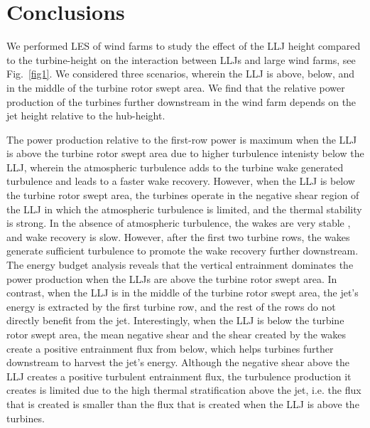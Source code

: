 \documentclass[%
 aip,
 amsmath,amssymb,
reprint,
twocolumn,%
author-numerical,%
]{revtex4-1}
\begin{document}
{{\section{Conclusions}\label{sec4} 
We performed LES of wind farms to study the effect of the LLJ height compared to the turbine-height on the interaction between LLJs and large wind farms, see Fig.\ \ref{fig1}. {\color{black} We considered three scenarios, wherein the LLJ is above, below, and in the middle of the turbine rotor swept area.} We find that the relative power production of the turbines further downstream in the wind farm depends on the jet height relative to the hub-height.} The power production relative to the first-row power is maximum when the LLJ is above the turbine rotor swept area due to higher turbulence intenisty below the LLJ, wherein the atmospheric turbulence adds to the turbine wake generated turbulence and leads to a faster wake recovery. {\color{black} However, when the LLJ is below the turbine rotor swept area,} the turbines operate in the negative shear region of the LLJ in which the atmospheric turbulence is limited, and the thermal stability is strong. In the absence of atmospheric turbulence, the wakes are very stable \cite{mao18, kec14}, and wake recovery is slow. However, after the first two turbine rows, the wakes generate sufficient turbulence to promote the wake recovery further downstream. \\
\indent The energy budget analysis reveals that the vertical entrainment dominates the power production when the LLJs are above the turbine rotor swept area. In contrast, when the LLJ is in the middle of the turbine rotor swept area, the jet's energy is extracted by the first turbine row, and the rest of the rows do not directly benefit from the jet. Interestingly, when the LLJ is below the turbine rotor swept area, the mean negative shear and the shear created by the wakes create a positive entrainment flux from below, which helps turbines further downstream to harvest the jet's energy. {\color{black} Although the negative shear above the LLJ creates a positive turbulent entrainment flux, the turbulence production it creates is limited due to the high thermal stratification above the jet, i.e. the flux that is created is smaller than the flux that is created when the LLJ is above the turbines.
}}\\
\end{document}

